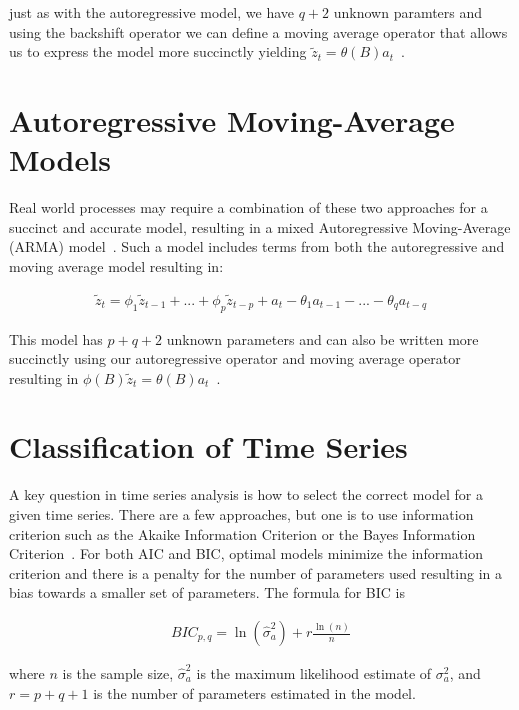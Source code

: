 \documentclass[oneside,12pt,openany]{book}
\begin{document}
	\noindent just as with the autoregressive model, we have $q+2$ unknown paramters and using the backshift operator we can define a moving average operator that allows us to express the model more succinctly yielding $\tilde{z}_{t}=\theta(B)a_{t}$~\cite{Box}.

	\section{Autoregressive Moving-Average Models}
	
	Real world processes may require a combination of these two approaches for a succinct and accurate model, resulting in a mixed Autoregressive Moving-Average (ARMA) model~\cite{Box}. Such a model includes terms from both the autoregressive and moving average model resulting in:
	
	\begin{align}
		\label{eqn:armamodel}
		\tilde{z}_{t}=\phi_{1} \tilde{z}_{t-1}+...+\phi_{p} \tilde{z}_{t-p}+a_{t}-\theta_{1}a_{t-1}-...-\theta_{q}a_{t-q}
	\end{align}
	
	\noindent This model has $p+q+2$ unknown parameters and can also be written more succinctly using our autoregressive operator and moving average operator resulting in $\phi(B)\tilde{z}_{t}=\theta(B)a_{t}$~\cite{Box}.

	\section{Classification of Time Series}

	A key question in time series analysis is how to select the correct model for a given time series. There are a few approaches, but one is to use information criterion such as the Akaike Information Criterion or the Bayes Information Criterion~\cite{Box}. For both AIC and BIC, optimal models minimize the information criterion and there is a penalty for the number of parameters used resulting in a bias towards a smaller set of parameters. The formula for BIC is

	\begin{align}
		\label{eqn:bic}
		BIC_{p,q}=\ln(\hat{\sigma}_{a}^{2})+r\frac{\ln(n)}{n}
	\end{align}

	\noindent where $n$ is the sample size, $\hat{\sigma}_{a}^{2}$ is the maximum likelihood estimate of $\sigma_{a}^{2}$, and $r=p+q+1$ is the number of parameters estimated in the model.
	
\end{document}
